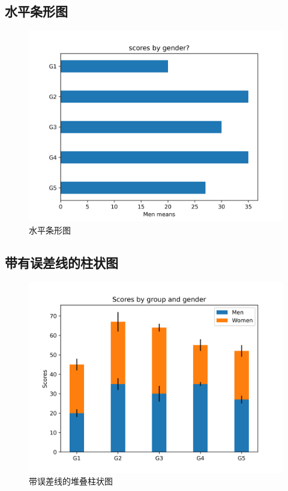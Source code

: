 \documentclass[openany]{progbookcn}
\begin{document}
\subsection{水平条形图}

\begin{figure}[H]
\centering
\includegraphics[width=0.6 \textwidth]{figs/chapter9/bars/HorizontalBar}
\caption{水平条形图}
\end{figure}

\subsection{带有误差线的柱状图}

\begin{figure}[H]
\centering
\includegraphics[width=0.6 \textwidth]{figs/chapter9/bars/StackedBar}
\caption{带误差线的堆叠柱状图}
\end{figure}
\end{document}
